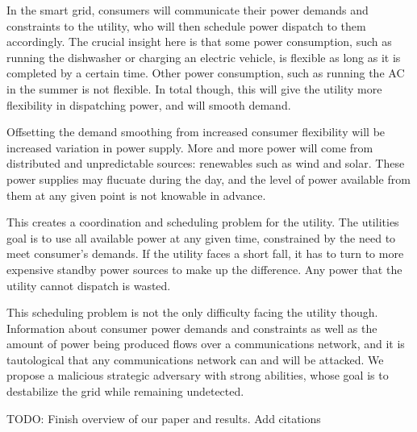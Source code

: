\documentclass[conference]{IEEEtran}
\begin{document}
In the smart grid, consumers will communicate their power demands and constraints to the utility, who will then schedule
power dispatch to them accordingly.  The crucial insight here is that some power consumption, such as running the dishwasher or charging an electric vehicle, is flexible as long as it is completed by a certain time.  Other power consumption, such as running the AC in the summer is not flexible.  In total though, this will give the utility more flexibility in dispatching power, and will smooth demand.

Offsetting the demand smoothing from increased consumer flexibility will be increased variation in power supply.  More and more power will come from distributed and unpredictable sources: renewables such as wind and solar.  These power supplies may flucuate during the day, and the level of power available from them at any given point is not knowable in advance.

This creates a coordination and scheduling problem for the utility.  The utilities goal is to use all available power at any
given time, constrained by the need to meet consumer's demands.  If the utility faces a short fall, it has to turn to more 
expensive standby power sources to make up the difference.  Any power that the utility cannot dispatch is wasted.

This scheduling problem is not the only difficulty facing the utility though.  Information about consumer power demands and constraints as well as the amount of power being produced flows over a communications network, and it is tautological that any communications network can and will be attacked.  We propose a malicious strategic adversary with strong abilities, whose goal is to destabilize the grid while remaining undetected. 

TODO: Finish overview of our paper and results.  Add citations
\end{document}
